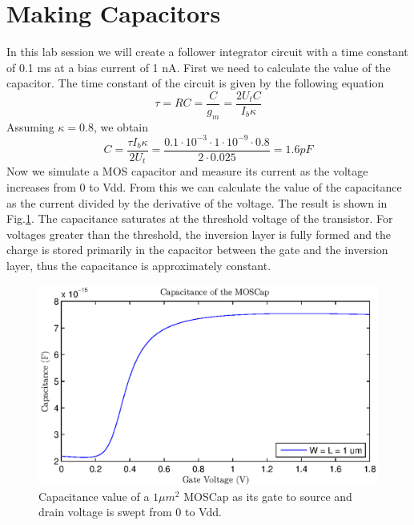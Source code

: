

\newcommand{\reffig}[1]{Fig.~\ref{#1}}



\newpage
\section{Making Capacitors}

In this lab session we will create a follower integrator circuit with a time constant of 0.1 ms at a bias current of 1 nA. First we need to calculate the value of the capacitor. The time constant of the circuit is given by the following equation
\begin{equation*}
	\tau = RC = \frac{C}{g_m} = \frac{2U_tC}{I_b\kappa} 
\end{equation*}
Assuming \(\kappa=0.8\), we obtain
\begin{equation*}
	C = \frac{\tau I_b\kappa}{2U_t} = \frac{0.1\cdot10^{-3}\cdot1\cdot10^{-9}\cdot0.8}{2\cdot0.025}=1.6 pF
\end{equation*}
Now we simulate a MOS capacitor and measure its current as the voltage increases from 0 to Vdd. From this we can calculate the value of the capacitance as the current divided by the derivative of the voltage. The result is shown in Fig.\ref{fig:1}. The capacitance saturates at the threshold voltage of the transistor. For voltages greater than the threshold, the inversion layer is fully formed and the charge is stored primarily in the capacitor between the gate and the inversion layer, thus the capacitance is approximately constant. 
\begin{figure}[!h]
	\center
	\includegraphics{exp1.eps}
	\caption{Capacitance value of a \(1 \mu m^2\) MOSCap as its gate to source and drain voltage is swept from 0 to Vdd.}
	\label{fig:1}
\end{figure}

